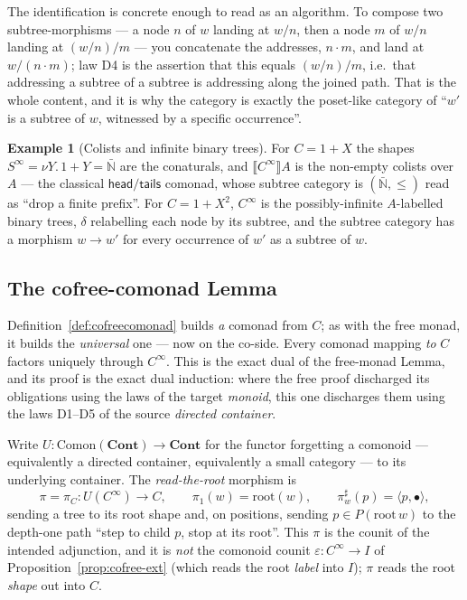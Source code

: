 \documentclass[11pt,a4paper]{book}
\newcommand{\Cont}{\mathbf{Cont}}
\newcommand{\Ext}[1]{\llbracket #1 \rrbracket}
\newcommand{\Comon}{\mathrm{Comon}}
\theoremstyle{plain}
\theoremstyle{definition}
\newtheorem{Example}[Theorem]{Example}
\theoremstyle{remark}
\begin{document}
The identification is concrete enough to read as an algorithm. To compose two subtree-morphisms
--- a node $n$ of $w$ landing at $w/n$, then a node $m$ of $w/n$ landing at $(w/n)/m$ --- you
concatenate the addresses, $n\cdot m$, and land at $w/(n\cdot m)$; law D4 is the assertion that
this equals $(w/n)/m$, i.e.\ that addressing a subtree of a subtree is addressing along the
joined path. That is the whole content, and it is why the category is exactly the poset-like
category of ``$w'$ is a subtree of $w$, witnessed by a specific occurrence''.

\begin{Example}[Colists and infinite binary trees]\label{ex:cofree}
For $C=1+X$ the shapes $S^{\infty}=\nu Y.\,1+Y=\bar{\mathbb N}$ are the conaturals, and
$\Ext{C^{\infty}}A$ is the non-empty colists over $A$ --- the classical
$\mathsf{head}/\mathsf{tails}$ comonad, whose subtree category is $(\bar{\mathbb N},\le)$ read
as ``drop a finite prefix''. For $C=1+X^{2}$, $C^{\infty}$ is the possibly-infinite
$A$-labelled binary trees, $\delta$ relabelling each node by its subtree, and the subtree
category has a morphism $w\to w'$ for every occurrence of $w'$ as a subtree of $w$.
\end{Example}

\subsection{The cofree-comonad Lemma}
\label{sec:moncomon-cofree-lemma}

Definition~\ref{def:cofreecomonad} builds \emph{a} comonad from $C$; as with the free monad,
it builds the \emph{universal} one --- now on the co-side. Every comonad mapping \emph{to} $C$
factors uniquely through $C^{\infty}$. This is the exact dual of the free-monad Lemma, and its
proof is the exact dual induction: where the free proof discharged its obligations using the
laws of the target \emph{monoid}, this one discharges them using the laws D1--D5 of the source
\emph{directed container}.

Write $U\colon\Comon(\Cont)\to\Cont$ for the functor forgetting a comonoid --- equivalently a
directed container, equivalently a small category --- to its underlying container. The
\emph{read-the-root} morphism is
\[
  \pi=\pi_{C}\colon U(C^{\infty})\longrightarrow C,\qquad
  \pi_{1}(w)=\mathrm{root}(w),\qquad
  \pi^{\sharp}_{w}(p)=\langle p,\bullet\rangle,
\]
sending a tree to its root shape and, on positions, sending $p\in P(\mathrm{root}\,w)$ to the
depth-one path ``step to child $p$, stop at its root''. This $\pi$ is the counit of the intended
adjunction, and it is \emph{not} the comonoid counit $\varepsilon\colon C^{\infty}\to I$ of
Proposition~\ref{prop:cofree-ext} (which reads the root \emph{label} into $I$); $\pi$ reads the
root \emph{shape} out into $C$.
\end{document}
